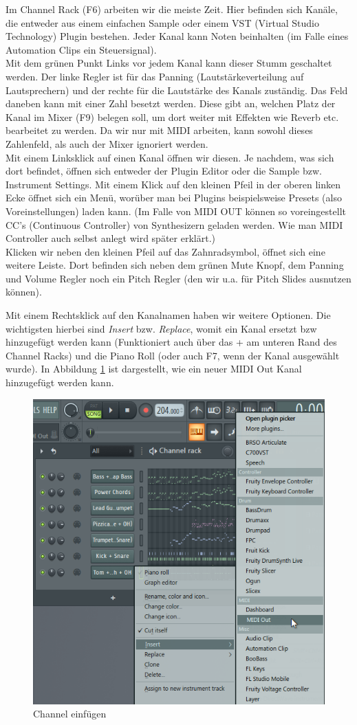 Im Channel Rack (F6) arbeiten wir die meiste Zeit. Hier befinden sich Kanäle, die entweder aus einem einfachen Sample oder einem VST (Virtual Studio Technology) Plugin bestehen. Jeder Kanal kann Noten beinhalten (im Falle eines Automation Clips ein Steuersignal). \\
Mit dem grünen Punkt Links vor jedem Kanal kann dieser Stumm geschaltet werden. Der linke Regler ist für das Panning (Lautstärkeverteilung auf Lautsprechern) und der rechte für die Lautstärke des Kanals zuständig. Das Feld daneben kann mit einer Zahl besetzt werden. Diese gibt an, welchen Platz der Kanal im Mixer (F9) belegen soll, um dort weiter mit Effekten wie Reverb etc. bearbeitet zu werden. Da wir nur mit MIDI arbeiten, kann sowohl dieses Zahlenfeld, als auch der Mixer ignoriert werden. \\
Mit einem Linksklick auf einen Kanal öffnen wir diesen. Je nachdem, was sich dort befindet, öffnen sich entweder der Plugin Editor oder die Sample bzw. Instrument Settings. Mit einem Klick auf den kleinen Pfeil in der oberen linken Ecke öffnet sich ein Menü, worüber man bei Plugins  beispielsweise Presets (also Voreinstellungen) laden kann. (Im Falle von MIDI OUT können so voreingestellt CC's (Continuous Controller) von Synthesizern geladen werden. Wie man MIDI Controller auch selbst anlegt wird später erklärt.) \\
Klicken wir neben den kleinen Pfeil auf das Zahnradsymbol, öffnet sich eine weitere Leiste. Dort befinden sich neben dem grünen Mute Knopf, dem Panning und Volume Regler noch ein Pitch Regler (den wir u.a. für Pitch Slides ausnutzen können).

\bigskip

Mit einem Rechtsklick auf den Kanalnamen haben wir weitere Optionen. Die wichtigsten hierbei sind \textit{Insert} bzw. \textit{Replace}, womit ein Kanal ersetzt bzw hinzugefügt werden kann (Funktioniert auch über das + am unteren Rand des Channel Racks) und die Piano Roll (oder auch F7, wenn der Kanal ausgewählt wurde). In Abbildung \ref{Channel} ist dargestellt, wie ein neuer MIDI Out Kanal hinzugefügt werden kann.


\begin{figure}[htbp] \centering
	\includegraphics[width=.70\linewidth]{images/Channel.png}
	\caption{Channel einfügen}
	\label{Channel}
\end{figure}


